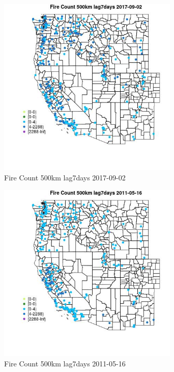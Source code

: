 \begin{figure} 
\centering  
\includegraphics[width=0.77\textwidth]{Code_Outputs/Report_ML_input_PM25_Step4_part_e_de_duplicated_aves_compiled_2019-05-21wNAs_MapObsFire_Count_500km_lag7days2017-09-02.jpg} 
\caption{\label{fig:Report_ML_input_PM25_Step4_part_e_de_duplicated_aves_compiled_2019-05-21wNAsMapObsFire_Count_500km_lag7days2017-09-02}Fire Count 500km lag7days 2017-09-02} 
\end{figure} 
 

\begin{figure} 
\centering  
\includegraphics[width=0.77\textwidth]{Code_Outputs/Report_ML_input_PM25_Step4_part_e_de_duplicated_aves_compiled_2019-05-21wNAs_MapObsFire_Count_500km_lag7days2011-05-16.jpg} 
\caption{\label{fig:Report_ML_input_PM25_Step4_part_e_de_duplicated_aves_compiled_2019-05-21wNAsMapObsFire_Count_500km_lag7days2011-05-16}Fire Count 500km lag7days 2011-05-16} 
\end{figure} 
 

